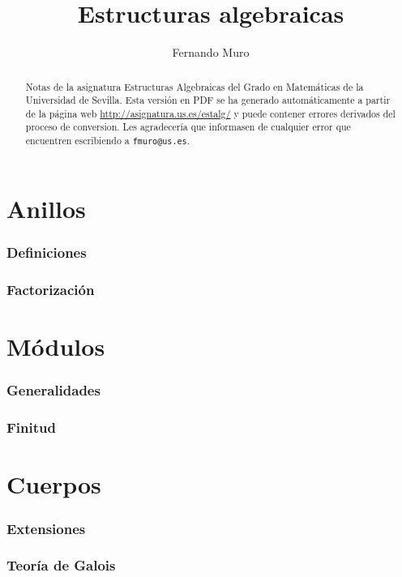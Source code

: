 \documentclass[]{amsart}
\title{Estructuras algebraicas}
\author{Fernando Muro}
\theoremstyle{definition}
\theoremstyle{remark}
\numberwithin{equation}{subsection}
\numberwithin{section}{part}
\begin{document}
\begin{abstract}
Notas de la asignatura Estructuras Algebraicas del Grado en Matemáticas de la Universidad de Sevilla. Esta versión en PDF se ha generado automáticamente a partir de la página web \url{http://asignatura.us.es/estalg/} y puede contener errores derivados del proceso de conversion. Les agradecería que informasen de cualquier error que encuentren escribiendo a \texttt{fmuro@us.es}.
\end{abstract}

\maketitle

\tableofcontents

\part{Anillos}



\section{Definiciones}



\section{Factorización}



\part{Módulos}



\section{Generalidades}



\section{Finitud}



\part{Cuerpos}



\section{Extensiones}



\section{Teoría de Galois}


\end{document}
